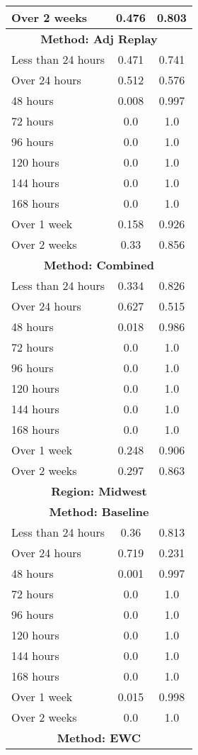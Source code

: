 \documentclass{article}
\begin{document}
\begin{longtable}{lcc}
Over 2 weeks & 0.476 & 0.803 \\
\midrule
\multicolumn{3}{c}{\textbf{Method: Adj Replay}} \\
\midrule
Less than 24 hours & 0.471 & 0.741 \\
Over 24 hours & 0.512 & 0.576 \\
48 hours & 0.008 & 0.997 \\
72 hours & 0.0 & 1.0 \\
96 hours & 0.0 & 1.0 \\
120 hours & 0.0 & 1.0 \\
144 hours & 0.0 & 1.0 \\
168 hours & 0.0 & 1.0 \\
Over 1 week & 0.158 & 0.926 \\
Over 2 weeks & 0.33 & 0.856 \\
\midrule
\multicolumn{3}{c}{\textbf{Method: Combined}} \\
\midrule
Less than 24 hours & 0.334 & 0.826 \\
Over 24 hours & 0.627 & 0.515 \\
48 hours & 0.018 & 0.986 \\
72 hours & 0.0 & 1.0 \\
96 hours & 0.0 & 1.0 \\
120 hours & 0.0 & 1.0 \\
144 hours & 0.0 & 1.0 \\
168 hours & 0.0 & 1.0 \\
Over 1 week & 0.248 & 0.906 \\
Over 2 weeks & 0.297 & 0.863 \\
\midrule
\midrule
\multicolumn{3}{c}{\textbf{Region: Midwest}} \\
\multicolumn{3}{c}{\textbf{Method: Baseline}} \\
\midrule
Less than 24 hours & 0.36 & 0.813 \\
Over 24 hours & 0.719 & 0.231 \\
48 hours & 0.001 & 0.997 \\
72 hours & 0.0 & 1.0 \\
96 hours & 0.0 & 1.0 \\
120 hours & 0.0 & 1.0 \\
144 hours & 0.0 & 1.0 \\
168 hours & 0.0 & 1.0 \\
Over 1 week & 0.015 & 0.998 \\
Over 2 weeks & 0.0 & 1.0 \\
\midrule
\multicolumn{3}{c}{\textbf{Method: EWC}} \\

\end{longtable}
\end{document}
